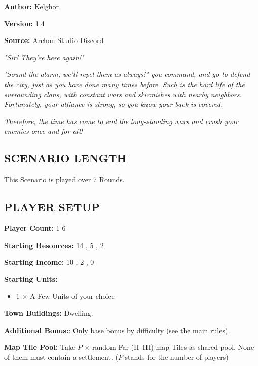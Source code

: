 
\begin{multicols*}{2}

\textbf{Author:} Kelghor

\textbf{Version:} 1.4

\textbf{Source:} \href{https://discord.com/channels/740870068178649108/1313651865648369725}{Archon Studio Discord}

\textit{"Sir! They're here again!"}

\textit{"Sound the alarm, we'll repel them as always!" you command, and go to defend the city, just as you have done many times before. Such is the hard life of the surrounding clans, with constant wars and skirmishes with nearby neighbors. Fortunately, your alliance is strong, so you know your back is covered.}

\textit{Therefore, the time has come to end the long-standing wars and crush your enemies once and for all!}

\subsection*{\MakeUppercase{Scenario Length}}

This Scenario is played over 7 Rounds.

\subsection*{\MakeUppercase{Player Setup}}

\textbf{Player Count:} 1-6

\textbf{Starting Resources:} 14 , 5 , 2 

\textbf{Starting Income:} 10 , 2 , 0 

\textbf{Starting Units:}
\begin{itemize}
  \item  1 × A Few  Units of your choice
\end{itemize}

\textbf{Town Buildings:}  Dwelling.

\textbf{Additional Bonus:}: Only base bonus by difficulty (see the main rules).

\textbf{Map Tile Pool:} Take $P$ × random Far (II–III) map Tiles as shared pool. None of them must contain a settlement. ($P$ stands for the number of players)


\end{multicols*}

